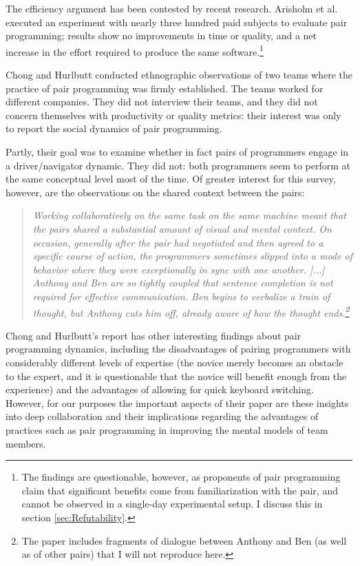 The efficiency argument has been contested by recent research. Arisholm {et al.}\  executed an experiment with nearly three hundred paid subjects to evaluate pair programming; results show no improvements in time or quality, and a net increase in the effort required to produce the same software.\footnote{The findings are questionable, however, as proponents of pair programming claim that significant benefits come from familiarization with the pair, and cannot be observed in a single-day experimental setup. I discuss this in section \ref{sec:Refutability}.}

Chong and Hurlbutt conducted ethnographic observations of two teams where the practice of pair programming was firmly established. The teams worked for different companies. They did not interview their teams, and they did not concern themselves with productivity or quality metrics: their interest was only to report the social dynamics of pair programming.

Partly, their goal was to examine whether in fact pairs of programmers engage in a driver/navigator dynamic. They did not: both programmers seem to perform at the same conceptual level most of the time. Of greater interest for this survey, however, are the observations on the shared context between the pairs:

\begin{quote}
\emph{Working collaboratively on the same task on the same machine meant that the pairs shared a substantial amount of visual and mental context. On occasion, generally after the pair had negotiated and then agreed to a specific course of action, the programmers sometimes slipped into a mode of behavior where they were exceptionally in sync with one another. [...] Anthony and Ben are so tightly coupled that sentence completion is not required for effective communication. Ben begins to verbalize a train of thought, but Anthony cuts him off, already aware of how the thought ends.\footnote{The paper includes fragments of dialogue between Anthony and Ben (as well as of other pairs) that I will not reproduce here.}}
\end{quote}

Chong and Hurlbutt's report has other interesting findings about pair programming dynamics, including the disadvantages of pairing programmers with considerably different levels of expertise (the novice merely becomes an obstacle to the expert, and it is questionable that the novice will benefit enough from the experience) and the advantages of allowing for quick keyboard switching. However, for our purposes the important aspects of their paper are these insights into deep collaboration and their implications regarding the advantages of practices such as pair programming in improving the mental models of team members.


